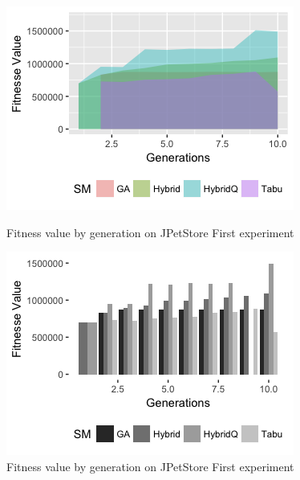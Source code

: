 \documentclass{bmcart}
\begin{document}
\begin{backmatter}
\begin{figure}[h]
\begin{minipage}{.5\textwidth}
\centering
\includegraphics{./images/experiment3-1.png}
\caption{Fitness value by generation on JPetStore First experiment}
\label{fig:experiment31}
\end{minipage}
\begin{minipage}{.5\textwidth}
\centering
\includegraphics{./images/experiment3-2.png}
\caption{Fitness value by generation on JPetStore First experiment}
\label{fig:experiment32}
\end{minipage}
\end{figure}


\end{backmatter}
\end{document}
